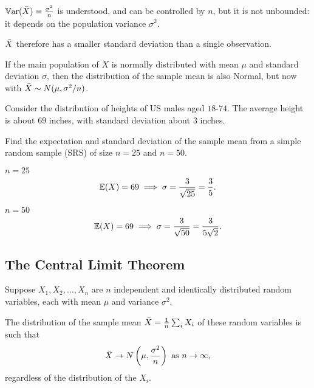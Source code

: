 \documentclass[10pt, a4paper]{article}
\begin{document}
$\mathbb{V}\mathrm{ar}(\Bar{X}) = \frac{\sigma ^ 2}{n}$ is understood,
and can be controlled by $n$,
but it is not unbounded:
it depends on the population variance $\sigma ^ 2$.

$\Bar{X}$ therefore has a smaller standard deviation than a single observation.

If the main population of $X$ is normally distributed with mean $\mu$ and standard deviation $\sigma$,
then the distribution of the sample mean is also Normal,
but now with $\Bar{X} \sim N(\mu, \sigma ^ 2 / n)$.

\begin{example}
    Consider the distribution of heights of US males aged $18$-$74$.
    The average height is about $69$ inches,
    with standard deviation about $3$ inches.

    Find the expectation and standard deviation of the sample mean from a simple random sample
    (SRS)
    of size $n = 25$ and $n = 50$.

    \begin{solution}
        $n = 25$
        \[
        \mathbb{E}(X) = 69 \implies \sigma = \frac{3}{\sqrt{25}} = \frac{3}{5}.
        \]

        $n = 50$
        \[
        \mathbb{E}(X) = 69 \implies \sigma = \frac{3}{\sqrt{50}} = \frac{3}{5\sqrt{2}}.
        \]
    \end{solution}
\end{example}

\subsection{The Central Limit Theorem}

\begin{theorem}
    Suppose $X_1, X_2, \dotsc, X_n$ are $n$ independent and identically distributed random variables,
    each with mean $\mu$ and variance $\sigma ^ 2$.

    The distribution of the sample mean $\Bar{X} = \frac{1}{n}\sum_{i}X_i$ of these random variables is such that
    \[
    \Bar{X} \rightarrow N\left(\mu, \frac{\sigma ^ 2}{n}\right) \text{ as } n \rightarrow \infty,
    \]
    regardless of the distribution of the $X_i$.
\end{theorem}
\end{document}
